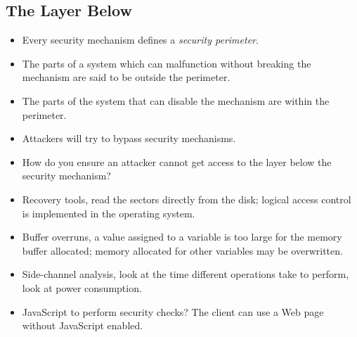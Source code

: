 \documentclass{beamer}
\begin{document}
\subsection{The Layer Below}

\begin{frame}
  \begin{itemize}
    \item Every security mechanism defines a \emph{security perimeter}.

    \item The parts of a system which can malfunction without breaking the 
      mechanism are said to be outside the perimeter.

    \item The parts of the system that can disable the mechanism are within the 
      perimeter.
  \end{itemize}
\end{frame}

\begin{frame}
  \begin{itemize}
    \item Attackers will try to bypass security mechanisms.

    \item How do you ensure an attacker cannot get access to the layer below 
      the security mechanism?
  \end{itemize}
\end{frame}

\begin{frame}
  \begin{itemize}
    \item Recovery tools, read the sectors directly from the disk; logical 
      access control is implemented in the operating system.

    \item Buffer overruns, a value assigned to a variable is too large for the 
      memory buffer allocated; memory allocated for other variables may be 
      overwritten.

    \item Side-channel analysis, look at the time different operations take to 
      perform, look at power consumption.

    \item JavaScript to perform security checks?
      The client can use a Web page without JavaScript enabled.

  \end{itemize}
\end{frame}



\begin{frame}[allowframebreaks]
	\small
  \printbibliography{}
\end{frame}
\end{document}
